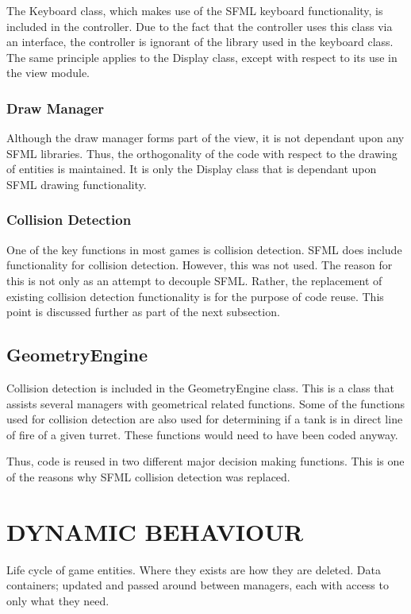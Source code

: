 \documentclass[10pt,twocolumn]{witseiepaper}
\begin{document}
The Keyboard class, which makes use of the SFML keyboard functionality, is included in the controller. Due to the fact that the controller uses this class via an interface, the controller is ignorant of the library used in the keyboard class. The same principle applies to the Display class, except with respect to its use in the view module. 

\subsubsection{Draw Manager} Although the draw manager forms part of the view, it is not dependant upon any SFML libraries. Thus, the orthogonality of the code with respect to the drawing of entities is maintained. It is only the Display class that is dependant upon SFML drawing functionality.

\subsubsection{Collision Detection} One of the key functions in most games is collision detection. SFML does include functionality for collision detection. However, this was not used. The reason for this is not only as an attempt to decouple SFML. Rather, the replacement of existing collision detection functionality is for the purpose of code reuse. This point is discussed further as part of the next subsection.

\subsection{GeometryEngine}
Collision detection is included in the GeometryEngine class. This is a class that assists several managers with geometrical related functions. Some of the functions used for collision detection are also used for determining if a tank is in direct line of fire of a given turret. These functions would need to have been coded anyway. 

Thus, code is reused in two different major decision making functions. This is one of the reasons why SFML collision detection was replaced. 




%
\section{DYNAMIC BEHAVIOUR} %
Life cycle of game entities. Where they exists are how they are deleted. Data containers; updated and passed around between managers, each with access to only what they need. 
\end{document}
